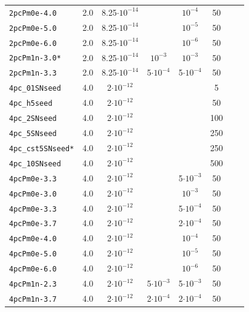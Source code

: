 \documentclass[preprint2]{aastex63}
\begin{document}
\begin{table}
\begin{tabular}{lccccccc}
\texttt{2pcPm0e-4.0  }   & 2.0 & 8.25$\cdot10^{-14}$ &                  & $     10^{-4}$  &  50  \\
\texttt{2pcPm0e-5.0  }   & 2.0 & 8.25$\cdot10^{-14}$ &                  & $     10^{-5}$  &  50  \\
\texttt{2pcPm0e-6.0  }   & 2.0 & 8.25$\cdot10^{-14}$ &                  & $     10^{-6}$  &  50  \\
\texttt{2pcPm1n-3.0* }   & 2.0 & 8.25$\cdot10^{-14}$ & $     10^{-3}$   & $     10^{-3}$  &  50  \\
\texttt{2pcPm1n-3.3  }   & 2.0 & 8.25$\cdot10^{-14}$ & 5$\cdot10^{-4}$  & 5$\cdot10^{-4}$ &  50  \\
\texttt{4pc\_01SNseed }  & 4.0 & 2$\cdot10^{-12}$    &                  &                 &  5   \\
\texttt{4pc\_h5seed   }  & 4.0 & 2$\cdot10^{-12}$    &                  &                 &  50  \\
\texttt{4pc\_2SNseed  }  & 4.0 & 2$\cdot10^{-12}$    &                  &                 & 100  \\
\texttt{4pc\_5SNseed  }  & 4.0 & 2$\cdot10^{-12}$    &                  &                 & 250  \\
\texttt{4pc\_cst5SNseed*}& 4.0 & 2$\cdot10^{-12}$    &                  &                 & 250  \\
\texttt{4pc\_10SNseed }  & 4.0 & 2$\cdot10^{-12}$    &                  &                 & 500  \\
\texttt{4pcPm0e-3.3  }   & 4.0 & 2$\cdot10^{-12}$    &                  & 5$\cdot10^{-3}$ &  50  \\
\texttt{4pcPm0e-3.0  }   & 4.0 & 2$\cdot10^{-12}$    &                  & $     10^{-3}$  &  50  \\
\texttt{4pcPm0e-3.3  }   & 4.0 & 2$\cdot10^{-12}$    &                  & 5$\cdot10^{-4}$ &  50  \\
\texttt{4pcPm0e-3.7  }   & 4.0 & 2$\cdot10^{-12}$    &                  & 2$\cdot10^{-4}$ &  50  \\
\texttt{4pcPm0e-4.0  }   & 4.0 & 2$\cdot10^{-12}$    &                  & $     10^{-4}$  &  50  \\
\texttt{4pcPm0e-5.0  }   & 4.0 & 2$\cdot10^{-12}$    &                  & $     10^{-5}$  &  50  \\
\texttt{4pcPm0e-6.0  }   & 4.0 & 2$\cdot10^{-12}$    &                  & $     10^{-6}$  &  50  \\
\texttt{4pcPm1n-2.3  }   & 4.0 & 2$\cdot10^{-12}$    & 5$\cdot10^{-3}$  & 5$\cdot10^{-3}$ &  50  \\
\texttt{4pcPm1n-3.7}     & 4.0 & 2$\cdot10^{-12}$    & 2$\cdot10^{-4}$  & 2$\cdot10^{-4}$ &  50    
\end{tabular}
\end{table}
\end{document}
